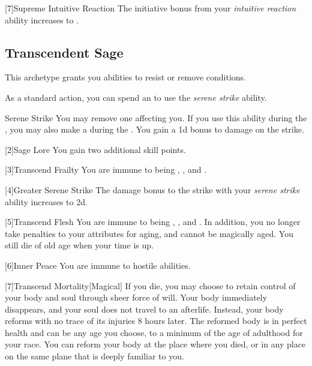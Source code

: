         [7]{Supreme Intuitive Reaction}
        The initiative bonus from your \textit{intuitive reaction} ability increases to .

    \subsection{Transcendent Sage}
        This archetype grants you abilities to resist or remove conditions.

         As a standard action, you can spend an  to use the \textit{serene strike} ability.
        \begin{ability}{Serene Strike}
            You may remove one  affecting you.
            If you use this ability during the , you may also make a  during the .
            You gain a \plus1d bonus to damage on the strike.
        \end{ability}

        [2]{Sage Lore} You gain two additional skill points.

        [3]{Transcend Frailty}
        You are immune to being , , and .

        [4]{Greater Serene Strike} The damage bonus to the strike with your \textit{serene strike} ability increases to \plus2d.

        [5]{Transcend Flesh}
        You are immune to being , , and .
        In addition, you no longer take penalties to your attributes for aging, and cannot be magically aged.
        You still die of old age when your time is up.

        [6]{Inner Peace}
        You are immune to hostile  abilities.

        [7]{Transcend Mortality}[Magical]
        If you die, you may choose to retain control of your body and soul through sheer force of will.
        Your body immediately disappears, and your soul does not travel to an afterlife.
        Instead, your body reforms with no trace of its injuries 8 hours later.
        The reformed body is in perfect health and can be any age you choose, to a minimum of the age of adulthood for your race.
        You can reform your body at the place where you died, or in any place on the same plane that is deeply familiar to you.

